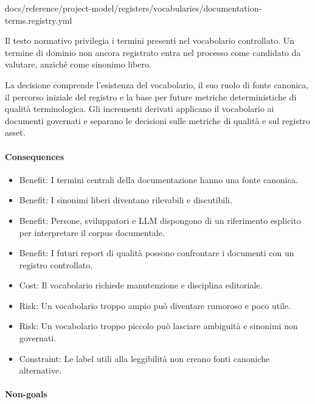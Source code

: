 \documentclass[
  10pt,
]{article}
\newenvironment{Shaded}{}{}
\newcommand{\NormalTok}[1]{#1}
\providecommand{\tightlist}{%
  \setlength{\itemsep}{0pt}\setlength{\parskip}{0pt}}
\begin{document}
\begin{Shaded}
\begin{Highlighting}[]
\NormalTok{docs/reference/project{-}model/registers/vocabularies/documentation{-}terms.registry.yml}
\end{Highlighting}
\end{Shaded}

Il testo normativo privilegia i termini presenti nel vocabolario
controllato. Un termine di dominio non ancora registrato entra nel
processo come candidato da valutare, anziché come sinonimo libero.

La decisione comprende l'esistenza del vocabolario, il suo ruolo di
fonte canonica, il percorso iniziale del registro e la base per future
metriche deterministiche di qualità terminologica. Gli incrementi
derivati applicano il vocabolario ai documenti governati e separano le
decisioni sulle metriche di qualità e sul registro asset.

\paragraph{Consequences}\label{consequences-2}

\begin{itemize}
\tightlist
\item
  Benefit: I termini centrali della documentazione hanno una fonte
  canonica.
\item
  Benefit: I sinonimi liberi diventano rilevabili e discutibili.
\item
  Benefit: Persone, sviluppatori e LLM dispongono di un riferimento
  esplicito per interpretare il corpus documentale.
\item
  Benefit: I futuri report di qualità possono confrontare i documenti
  con un registro controllato.
\item
  Cost: Il vocabolario richiede manutenzione e disciplina editoriale.
\item
  Risk: Un vocabolario troppo ampio può diventare rumoroso e poco utile.
\item
  Risk: Un vocabolario troppo piccolo può lasciare ambiguità e sinonimi
  non governati.
\item
  Constraint: Le label utili alla leggibilità non creano fonti canoniche
  alternative.
\end{itemize}

\paragraph{Non-goals}\label{non-goals-1}
\end{document}
